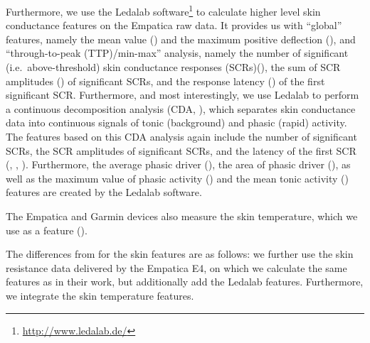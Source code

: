 \documentclass[output=paper]{langsci/langscibook}
\begin{document}
Furthermore, we use the Ledalab software\footnote{\url{http://www.ledalab.de/}} to calculate higher level skin conductance features on the Empatica raw data. It provides us with ``global'' features, namely the mean value (\ledalabGlMean{}) and the maximum positive deflection (\ledalabGlMaxDefl{}), and ``through-to-peak (TTP)/min-max'' analysis, namely the number of significant (i.e.\ above-threshold) skin conductance responses (SCRs)\linebreak (\ledalabttpnscr{}), the sum of SCR amplitudes (\ledalabttpampsum{}) of significant SCRs, and the response latency (\ledalabttplatency{}) of the first significant SCR. Furthermore, and most interestingly, we use Ledalab to perform a continuous decomposition analysis (CDA, \citealt{benedek2010ledalabCDA}), which separates skin conductance data into continuous signals of tonic (background) and phasic (rapid) activity.
The features based on this CDA analysis again include the number of significant SCRs, the SCR amplitudes of significant SCRs, and the latency of the first SCR (\ledalabcdanscr{}, \ledalabcdaampsum{}, \ledalabcdalatency{}). Furthermore, the average phasic driver (\ledalabcdascr{}), the area of phasic driver (\ledalabcdaiscr{}), as well as the maximum value of phasic activity (\ledalabcdaPhasicMax{}) and the mean tonic activity (\ledalabcdaTonic{}) features are created by the Ledalab software.

The Empatica and Garmin devices also measure the skin temperature, which we use as a feature (\skintemp{}{}). %

The differences from \citet{herbig2019mt} for the skin features are as follows: we further use the skin resistance data delivered by the Empatica E4, on which we calculate the same features as in their work, but additionally add the Ledalab features. Furthermore, we integrate the skin temperature features.
\end{document}
